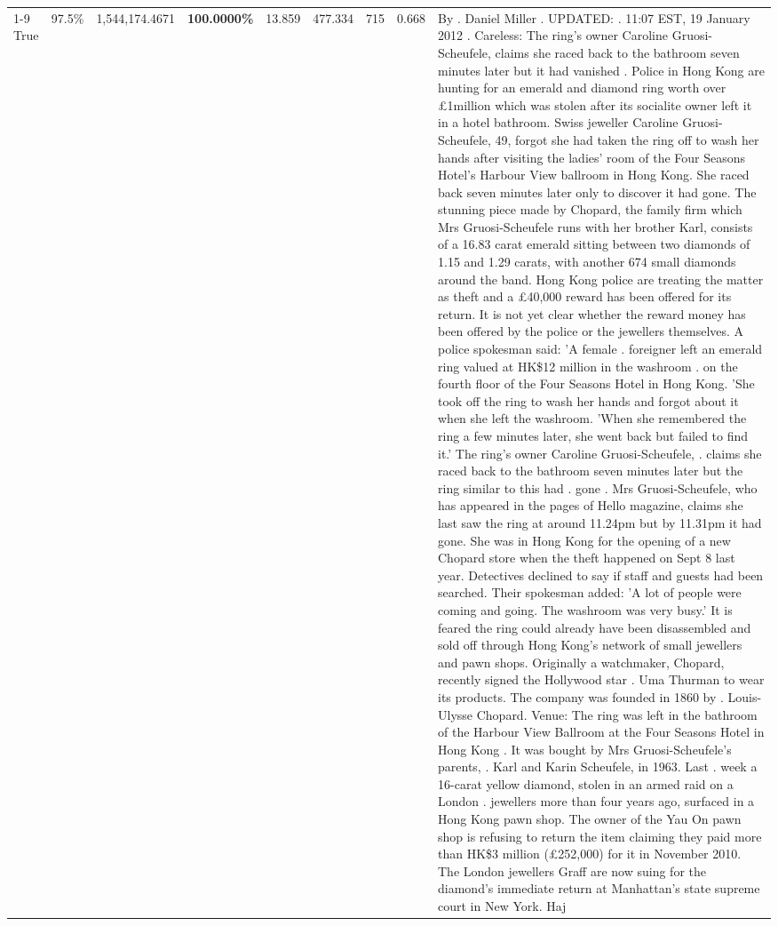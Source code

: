 \begin{table}[H]
\begin{tabular}{lllrlllll}
\cline{1-9}
True & 97.5\% & 1,544,174.4671 & \bfseries \color{red} 100.0000\% & 13.859 & 477.334 & 715 & 0.668 & By . Daniel Miller . UPDATED: . 11:07 EST, 19 January 2012 . Careless: The ring's owner Caroline Gruosi-Scheufele, claims she raced back to the bathroom seven minutes later but it had vanished . Police in Hong Kong are hunting for an emerald and diamond ring worth over £1million which was stolen after its socialite owner left it in a hotel bathroom. Swiss jeweller Caroline Gruosi-Scheufele, 49, forgot she had taken the ring off to wash her hands after visiting the ladies' room of the Four Seasons Hotel's Harbour View ballroom in Hong Kong. She raced back seven minutes later only to discover it had gone. The stunning piece made by Chopard, the family firm which Mrs Gruosi-Scheufele runs with her brother Karl, consists of a 16.83 carat emerald sitting between two diamonds of 1.15 and 1.29 carats, with another 674 small diamonds around the band. Hong Kong police are treating the matter as theft and a £40,000 reward has been offered for its return. It is not yet clear whether the reward money has been offered by the police or the jewellers themselves. A police spokesman said: 'A female . foreigner left an emerald ring valued at HK\$12 million in the washroom . on the fourth floor of the Four Seasons Hotel in Hong Kong. 'She took off the ring to wash her hands and forgot about it when she left the washroom. 'When she remembered the ring a few minutes later, she went back but failed to find it.' The ring's owner Caroline Gruosi-Scheufele, . claims she raced back to the bathroom seven minutes later but the ring similar to this had . gone . Mrs Gruosi-Scheufele, who has appeared in the pages of Hello magazine, claims she last saw the ring at around 11.24pm but by 11.31pm it had gone. She was in Hong Kong for the opening of a new Chopard store when the theft happened on Sept 8 last year. Detectives declined to say if staff and guests had been searched. Their spokesman added: 'A lot of people were coming and going. The washroom was very busy.' It is feared the ring could already have been disassembled and sold off through Hong Kong's network of small jewellers and pawn shops. Originally a watchmaker, Chopard, recently signed the Hollywood star . Uma Thurman to wear its products. The company was founded in 1860 by . Louis-Ulysse Chopard. Venue: The ring was left in the bathroom of the Harbour View Ballroom at the Four Seasons Hotel in Hong Kong . It was bought by Mrs Gruosi-Scheufele's  parents, . Karl and Karin Scheufele, in 1963. Last . week a 16-carat yellow diamond, stolen in an armed raid on a London . jewellers more than four years ago, surfaced in a Hong Kong pawn shop. The owner of the Yau On pawn shop is refusing to return the item claiming they paid more than HK\$3 million (£252,000) for it in November 2010. The London jewellers Graff are now suing for the diamond’s immediate return at Manhattan’s state supreme court in New York. Haj \\

\end{tabular}
\end{table}
